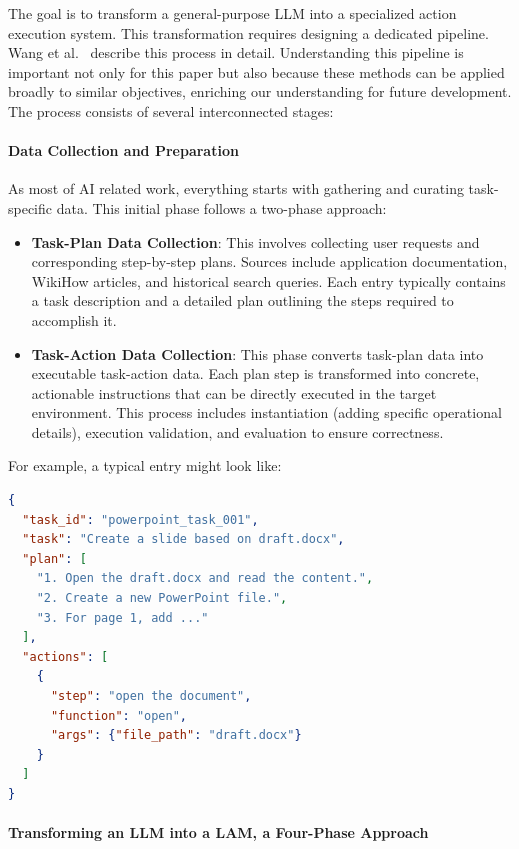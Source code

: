 \documentclass[journal,twoside,10pt]{IEEEtran}
\begin{document}
The goal is to transform a general-purpose LLM into a specialized action execution system. This transformation requires designing a dedicated pipeline. Wang et al.~\cite{wang2025lam} describe this process in detail. Understanding this pipeline is important not only for this paper but also because these methods can be applied broadly to similar objectives, enriching our understanding for future development. The process consists of several interconnected stages:

\paragraph{Data Collection and Preparation}
As most of AI related work, everything starts with gathering and curating task-specific data. This initial phase follows a two-phase approach:

\begin{itemize}
    \item \textbf{Task-Plan Data Collection}: This involves collecting user requests and corresponding step-by-step plans. Sources include application documentation, WikiHow articles, and historical search queries. Each entry typically contains a task description and a detailed plan outlining the steps required to accomplish it.
    
    \item \textbf{Task-Action Data Collection}: This phase converts task-plan data into executable task-action data. Each plan step is transformed into concrete, actionable instructions that can be directly executed in the target environment. This process includes instantiation (adding specific operational details), execution validation, and evaluation to ensure correctness.
\end{itemize}

For example, a typical entry might look like:

\begin{lstlisting}[language=JSON]
{
  "task_id": "powerpoint_task_001",
  "task": "Create a slide based on draft.docx",
  "plan": [
    "1. Open the draft.docx and read the content.",
    "2. Create a new PowerPoint file.",
    "3. For page 1, add ..."
  ],
  "actions": [
    {
      "step": "open the document",
      "function": "open",
      "args": {"file_path": "draft.docx"}
    }
  ]
}
\end{lstlisting}

\paragraph{Transforming an LLM into a LAM, a Four-Phase Approach}
\end{document}
